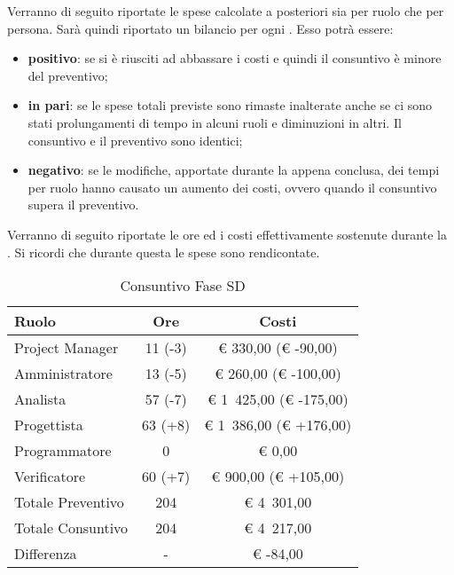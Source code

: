 	Verranno di seguito riportate le spese calcolate a posteriori sia per ruolo che per persona.
	Sarà quindi riportato un bilancio per ogni . Esso potrà essere:
	\begin{itemize}
		\item \textbf{positivo}: se si è riusciti ad abbassare i costi e quindi il consuntivo è minore del preventivo;
		\item \textbf{in pari}: se le spese totali previste sono rimaste inalterate anche se ci sono stati prolungamenti di tempo in alcuni ruoli e diminuzioni in altri. Il consuntivo e il preventivo sono identici;
		\item \textbf{negativo}: se le modifiche, apportate durante la  appena conclusa, dei tempi per ruolo hanno causato un aumento dei costi, ovvero quando il consuntivo supera il preventivo.
	\end{itemize}

			Verranno di seguito riportate le ore ed i costi effettivamente sostenute durante la . Si ricordi che durante questa  le spese sono rendicontate.
			\begin{table}[H]
				\begin{center}
					\begin{tabular}{| l | c | c |}
						\hline
						Ruolo 				& Ore 	& Costi  \\ \hline
						
						Project Manager		& 11 (-3) 		& \euro{} 330,00 (\euro{} -90,00)	\\
						Amministratore 		& 13 (-5)		& \euro{} 260,00 (\euro{} -100,00)	\\
						Analista			& 57 (-7)		& \euro{} 1~425,00 (\euro{} -175,00)	\\
						Progettista 		& 63 (+8)		& \euro{} 1~386,00  (\euro{} +176,00)	\\
						Programmatore		& 0				& \euro{} 0,00	\\
						Verificatore		& 60 (+7)		& \euro{} 900,00 (\euro{} +105,00)	\\ \hline \hline
							
						Totale Preventivo	& 204 			& \euro{} 4~301,00 	\\ \hline
						Totale Consuntivo	& 204 			& \euro{} 4~217,00 	\\ \hline
						Differenza			& - 			& \euro{} -84,00 	\\ \hline	
					\end{tabular}
				\end{center}
				\caption{Consuntivo Fase SD}
			\end{table}

